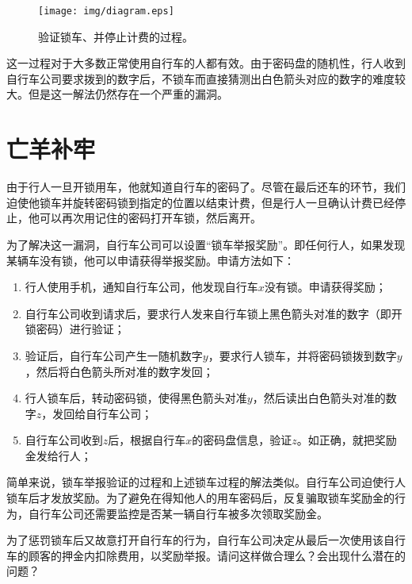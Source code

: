 \documentclass[UTF8]{article}
\begin{document}
\begin{figure}[htbp]
  \centering
  \texttt{[image: img/diagram.eps]}
  \caption{验证锁车、并停止计费的过程。}
  \label{fig:lock-diagram}
\end{figure}

这一过程对于大多数正常使用自行车的人都有效。由于密码盘的随机性，行人收到自行车公司要求拨到的数字后，不锁车而直接猜测出白色箭头对应的数字的难度较大。但是这一解法仍然存在一个严重的漏洞。

\section{亡羊补牢}
由于行人一旦开锁用车，他就知道自行车的密码了。尽管在最后还车的环节，我们迫使他锁车并旋转密码锁到指定的位置以结束计费，但是行人一旦确认计费已经停止，他可以再次用记住的密码打开车锁，然后离开。

为了解决这一漏洞，自行车公司可以设置“锁车举报奖励”。即任何行人，如果发现某辆车没有锁，他可以申请获得举报奖励。申请方法如下：

\begin{enumerate}
\item 行人使用手机，通知自行车公司，他发现自行车$x$没有锁。申请获得奖励；
\item 自行车公司收到请求后，要求行人发来自行车锁上黑色箭头对准的数字（即开锁密码）进行验证；
\item 验证后，自行车公司产生一随机数字$y$，要求行人锁车，并将密码锁拨到数字$y$，然后将白色箭头所对准的数字发回；
\item 行人锁车后，转动密码锁，使得黑色箭头对准$y$，然后读出白色箭头对准的数字$z$，发回给自行车公司；
\item 自行车公司收到$z$后，根据自行车$x$的密码盘信息，验证$z$。如正确，就把奖励金发给行人；
\end{enumerate}

简单来说，锁车举报验证的过程和上述锁车过程的解法类似。自行车公司迫使行人锁车后才发放奖励。为了避免在得知他人的用车密码后，反复骗取锁车奖励金的行为，自行车公司还需要监控是否某一辆自行车被多次领取奖励金。

\begin{Exercise}
为了惩罚锁车后又故意打开自行车的行为，自行车公司决定从最后一次使用该自行车的顾客的押金内扣除费用，以奖励举报。请问这样做合理么？会出现什么潜在的问题？
\end{Exercise}

\ifx\wholebook\relax \else
\end{document}
